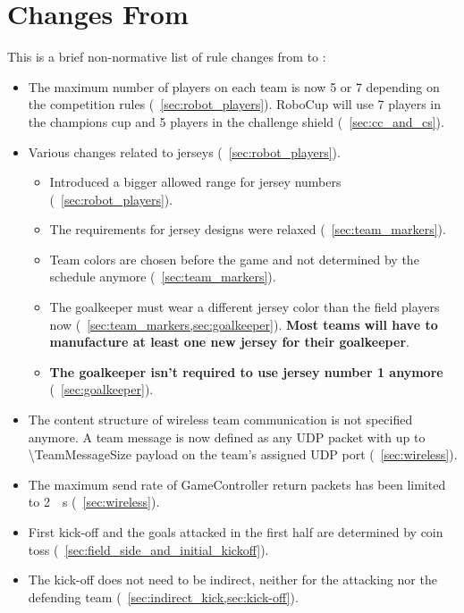 \section{Changes From \LastRCYear}

This is a brief non-normative list of rule changes from \LastRCYear to \RCYear:
\begin{itemize}
  \item The maximum number of players on each team is now 5 or 7 depending on the competition rules (\cf~\cref{sec:robot_players}).
    RoboCup \RCYear will use 7 players in the champions cup and 5 players in the challenge shield (\cf~\cref{sec:cc_and_cs}).
  \item Various changes related to jerseys (\cf~\cref{sec:robot_players}).
  \begin{itemize}
    \item Introduced a bigger allowed range for jersey numbers (\cf~\cref{sec:robot_players}).
    \item The requirements for jersey designs were relaxed (\cf~\cref{sec:team_markers}).
    \item Team colors are chosen before the game and not determined by the schedule anymore (\cf~\cref{sec:team_markers}).
    \item The goalkeeper must wear a different jersey color than the field players now (\cf~\cref{sec:team_markers,sec:goalkeeper}).
      \textbf{Most teams will have to manufacture at least one new jersey for their goalkeeper}.
    \item \textbf{The goalkeeper isn't required to use jersey number 1 anymore} (\cf~\cref{sec:goalkeeper}).
  \end{itemize}
  \item The content structure of wireless team communication is not specified anymore.
    A team message is now defined as any UDP packet with up to \qty{\TeamMessageSize}{\byte} payload on the team's assigned UDP port (\cf~\cref{sec:wireless}).
  \item The maximum send rate of GameController return packets has been limited to \qty{2}{\per\second} (\cf~\cref{sec:wireless}).
  \item First kick-off and the goals attacked in the first half are determined by coin toss (\cf~\cref{sec:field_side_and_initial_kickoff}).
  \item The kick-off does not need to be indirect, neither for the attacking nor the defending team (\cf~\cref{sec:indirect_kick,sec:kick-off}).

\end{itemize}
